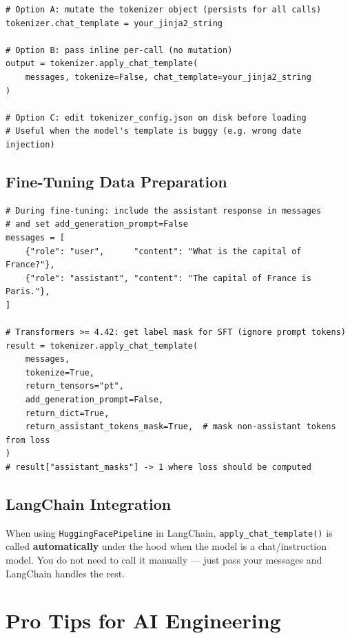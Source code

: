 \documentclass[11pt,a4paper]{article}
\newcommand{\api}[1]{\texttt{\color{teal}#1}}
\begin{document}
\begin{lstlisting}[style=pycode]
# Option A: mutate the tokenizer object (persists for all calls)
tokenizer.chat_template = your_jinja2_string

# Option B: pass inline per-call (no mutation)
output = tokenizer.apply_chat_template(
    messages, tokenize=False, chat_template=your_jinja2_string
)

# Option C: edit tokenizer_config.json on disk before loading
# Useful when the model's template is buggy (e.g. wrong date injection)
\end{lstlisting}

\subsection{Fine-Tuning Data Preparation}

\begin{lstlisting}[style=pycode]
# During fine-tuning: include the assistant response in messages
# and set add_generation_prompt=False
messages = [
    {"role": "user",      "content": "What is the capital of France?"},
    {"role": "assistant", "content": "The capital of France is Paris."},
]

# Transformers >= 4.42: get label mask for SFT (ignore prompt tokens)
result = tokenizer.apply_chat_template(
    messages,
    tokenize=True,
    return_tensors="pt",
    add_generation_prompt=False,
    return_dict=True,
    return_assistant_tokens_mask=True,  # mask non-assistant tokens from loss
)
# result["assistant_masks"] -> 1 where loss should be computed
\end{lstlisting}

\subsection{LangChain Integration}

When using \texttt{HuggingFacePipeline} in LangChain, \api{apply\_chat\_template()} is called \textbf{automatically} under the hood when the model is a chat/instruction model. You do not need to call it manually --- just pass your messages and LangChain handles the rest.

\section{Pro Tips for AI Engineering}
\end{document}

